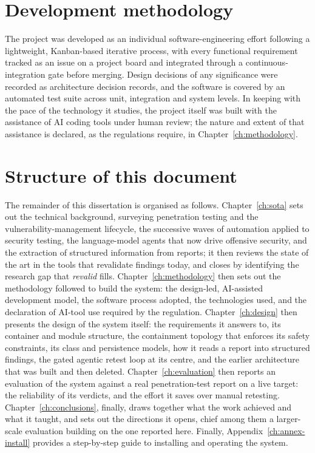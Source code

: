 \section{Development methodology}
\label{sec:methodology}

The project was developed as an individual software-engineering effort following a
lightweight, Kanban-based iterative process, with every functional requirement
tracked as an issue on a project board and integrated through a
continuous-integration gate before merging. Design decisions of any significance
were recorded as architecture decision records, and the software is covered by an
automated test suite across unit, integration and system levels. In keeping with
the pace of the technology it studies, the project itself was built with the
assistance of AI coding tools under human review; the nature and extent of that
assistance is declared, as the regulations require, in Chapter~\ref{ch:methodology}.

\section{Structure of this document}
\label{sec:structure}

The remainder of this dissertation is organised as follows.
Chapter~\ref{ch:sota} sets out the technical background, surveying penetration testing
and the vulnerability-management lifecycle, the successive waves of automation
applied to security testing, the language-model agents that now drive offensive
security, and the extraction of structured information from reports; it then reviews
the state of the art in the tools that revalidate findings today, and closes by
identifying the research gap that \emph{revalid} fills. Chapter~\ref{ch:methodology}
then sets out the methodology followed to build the system: the design-led,
AI-assisted development model, the software process adopted, the technologies used,
and the declaration of AI-tool use required by the regulation.
Chapter~\ref{ch:design} then presents the design of the system itself: the
requirements it answers to, its container and module structure, the containment
topology that enforces its safety constraints, its class and persistence models, how
it reads a report into structured findings, the gated agentic retest loop at its
centre, and the earlier architecture that was built and then deleted.
Chapter~\ref{ch:evaluation} then reports an evaluation of the system
against a real penetration-test report on a live target: the reliability of its
verdicts, and the effort it saves over manual retesting. Chapter~\ref{ch:conclusions},
finally, draws together what the work achieved and what it taught, and sets out the
directions it opens, chief among them a larger-scale evaluation building on the
one reported here. Finally, Appendix~\ref{ch:annex-install} provides a step-by-step
guide to installing and operating the system.
